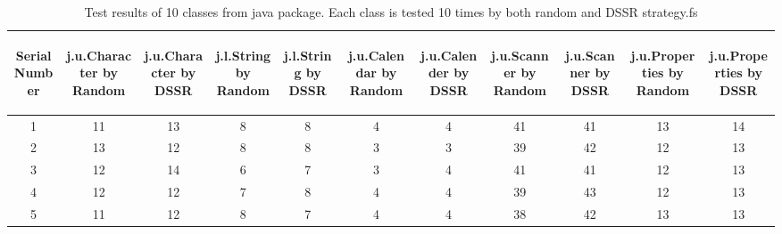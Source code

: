 \begin{table}[ht]
\caption{Test results of 10 classes from java package. Each class is tested 10 times by both random and DSSR strategy.fs} %
\centering %
\begin{tabular}{| c | c | c | c | c | c | c | c | c | c | c |} %
\hline\hline %
 \begin{sideways} Serial Number \end{sideways} &  \begin{sideways} j.u.Character by Random \end{sideways} &  \begin{sideways} j.u.Character by DSSR \end{sideways} &  \begin{sideways} j.l.String by Random \end{sideways} &  \begin{sideways} j.l.String by DSSR \end{sideways} & \begin{sideways} j.u.Calendar by Random \end{sideways} &  \begin{sideways}j.u.Calender by DSSR \end{sideways} &  \begin{sideways}j.u.Scanner by Random \end{sideways} &  \begin{sideways} j.u.Scanner by DSSR \end{sideways} &  \begin{sideways} j.u.Properties by Random \end{sideways} &  \begin{sideways} j.u.Properties by DSSR \end{sideways}  \\ [0.5ex] %
\hline %
1 & 11 & 13 & 8 & 8 & 4 & 4 & 41 & 41 & 13 & 14\\ %

2 & 13 & 12 & 8 & 8 & 3 & 3 & 39 & 42 & 12 & 13\\

3 & 12 & 14 & 6 & 7 & 3 & 4 & 41 & 41 & 12 & 13\\

4 & 12 & 12 & 7 & 8 & 4 & 4 & 39 & 43 & 12 & 13\\

5 & 11 & 12 & 8 & 7 & 4 & 4 & 38 & 42 & 13 & 13\\


\end{tabular}
\end{table}
